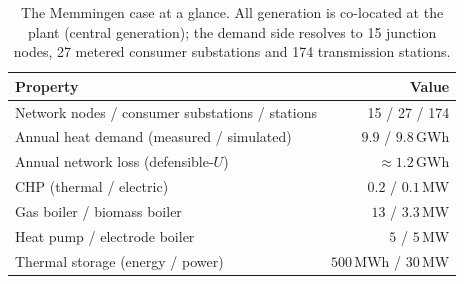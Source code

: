 \begin{table}[t]
\centering
\caption{The Memmingen case at a glance. All generation is co-located at the plant (central
generation); the demand side resolves to 15 junction nodes, 27 metered consumer substations and
174 transmission stations.}
\label{tab:casesummary}
\begin{tabular}{lr}
\hline
Property & Value \\
\hline
Network nodes / consumer substations / stations & 15 / 27 / 174 \\
Annual heat demand (measured / simulated) & $9.9$ / $9.8$\,GWh \\
Annual network loss (defensible-$U$) & $\approx 1.2$\,GWh \\
CHP (thermal / electric) & $0.2$ / $0.1$\,MW \\
Gas boiler / biomass boiler & $13$ / $3.3$\,MW \\
Heat pump / electrode boiler & $5$ / $5$\,MW \\
Thermal storage (energy / power) & $500$\,MWh / $30$\,MW \\
\hline
\end{tabular}
\end{table}
